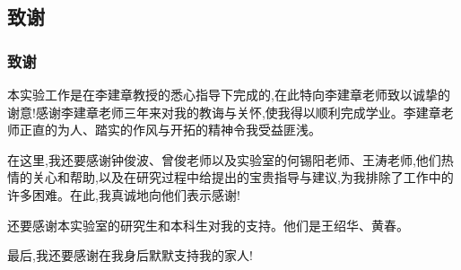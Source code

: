 \documentclass[xetex,compress]{mybeamer}
\begin{document}
\subsection{致谢}
\begin{frame}
\frametitle{致谢}
\begin{block}{}
本实验工作是在李建章教授的悉心指导下完成的,在此特向李建章老师致以诚挚的谢意!感谢李建章老师三年来对我的教诲与关怀,使我得以顺利完成学业。李建章老师正直的为人、踏实的作风与开拓的精神令我受益匪浅。

在这里,我还要感谢钟俊波、曾俊老师以及实验室的何锡阳老师、王涛老师,他们热情的关心和帮助,以及在研究过程中给提出的宝贵指导与建议,为我排除了工作中的许多困难。在此,我真诚地向他们表示感谢!

还要感谢本实验室的研究生和本科生对我的支持。他们是王绍华、黄春。

最后,我还要感谢在我身后默默支持我的家人!
\end{block}
\end{frame}
\end{document}
